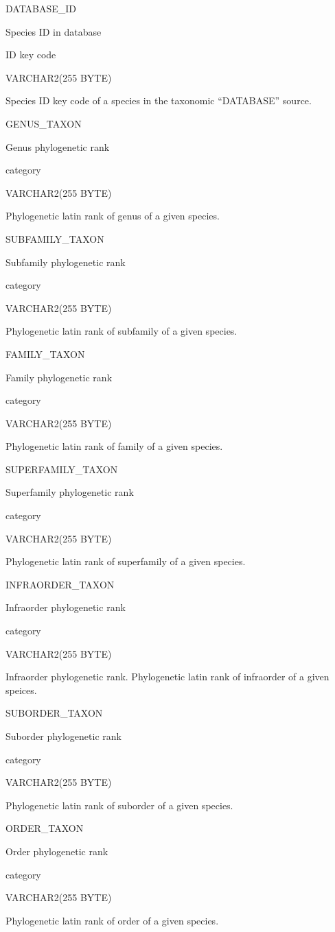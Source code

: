 \documentclass[
  letterpaper,
  oneside,
  open=any]{scrbook}
\begin{document}
DATABASE\_ID

Species ID in database

ID key code

VARCHAR2(255 BYTE)

Species ID key code of a species in the taxonomic ``DATABASE'' source.

GENUS\_TAXON

Genus phylogenetic rank

category

VARCHAR2(255 BYTE)

Phylogenetic latin rank of genus of a given species.

SUBFAMILY\_TAXON

Subfamily phylogenetic rank

category

VARCHAR2(255 BYTE)

Phylogenetic latin rank of subfamily of a given species.

FAMILY\_TAXON

Family phylogenetic rank

category

VARCHAR2(255 BYTE)

Phylogenetic latin rank of family of a given species.

SUPERFAMILY\_TAXON

Superfamily phylogenetic rank

category

VARCHAR2(255 BYTE)

Phylogenetic latin rank of superfamily of a given species.

INFRAORDER\_TAXON

Infraorder phylogenetic rank

category

VARCHAR2(255 BYTE)

Infraorder phylogenetic rank. Phylogenetic latin rank of infraorder of a
given speices.

SUBORDER\_TAXON

Suborder phylogenetic rank

category

VARCHAR2(255 BYTE)

Phylogenetic latin rank of suborder of a given species.

ORDER\_TAXON

Order phylogenetic rank

category

VARCHAR2(255 BYTE)

Phylogenetic latin rank of order of a given species.
\end{document}
